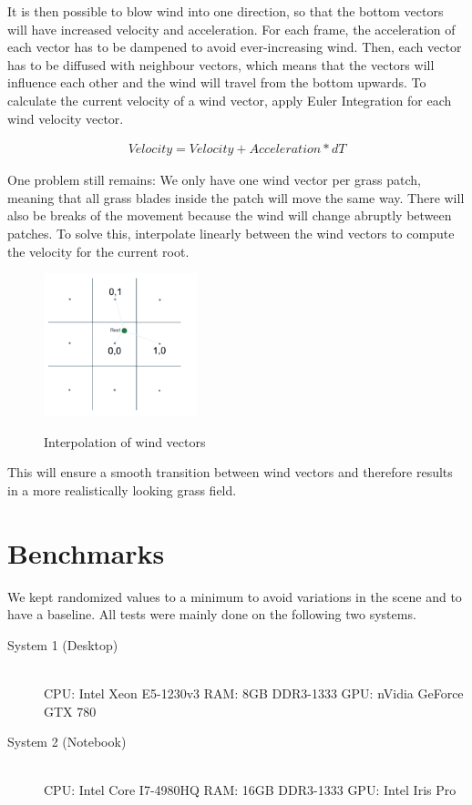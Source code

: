 \documentclass[conference]{acmsiggraph}
\begin{document}
It is then possible to blow wind into one direction, so that the bottom vectors will have increased velocity and acceleration. For each frame, the acceleration of each vector has to be dampened to avoid ever-increasing wind. Then, each vector has to be diffused with neighbour vectors, which means that the vectors will influence each other and the wind will travel from the bottom upwards. To calculate the current velocity of a wind vector, apply Euler Integration for each wind velocity vector.

\begin{center}
\begin{align}
Velocity = Velocity + Acceleration * dT
\end{align}
\end{center}

One problem still remains: We only have one wind vector per grass patch, meaning that all grass blades inside the patch will move the same way. There will also be breaks of the movement because the wind will change abruptly between patches. To solve this, interpolate linearly between the wind vectors to compute the velocity for the current root.

 \begin{figure}[ht]
   \centering
   \includegraphics[width=1.75in]{images/wind_field_interpolation}
   \caption{Interpolation of wind vectors} \cite{EddieLee}
 \end{figure}

This will ensure a smooth transition between wind vectors and therefore results in a more realistically looking grass field.

\section{Benchmarks}
We kept randomized values to a minimum to avoid variations in the scene and to have a baseline. All tests were mainly done on the following two systems.

\begin{flushleft}
\begin{description}
  \item[System 1 (Desktop)] \hfill \\
  CPU: Intel Xeon E5-1230v3 \linebreak
  RAM: 8GB DDR3-1333 \linebreak
  GPU: nVidia GeForce GTX 780
  \item[System 2 (Notebook)] \hfill \\
  CPU: Intel Core I7-4980HQ \linebreak
  RAM: 16GB DDR3-1333 \linebreak
  GPU: Intel Iris Pro
\end{description}
\end{flushleft}
\end{document}
